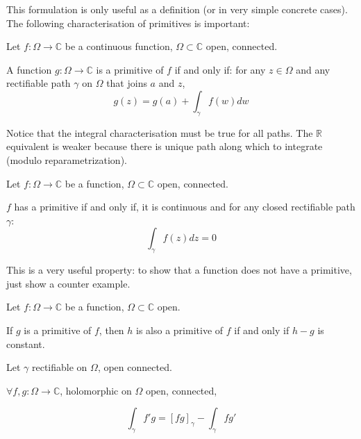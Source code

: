 This formulation is only useful as a definition (or in very simple concrete cases). The following characterisation of primitives is important:

\begin{thm*}
    Let $f: \Omega \rightarrow \mathbb{C}$ be a continuous function, $\Omega\subset\mathbb{C}$ open, connected.

    A function $g: \Omega \rightarrow \mathbb{C}$ is a primitive of $f$ if and only if: for any $z\in\Omega$ and any rectifiable path $\gamma$ on $\Omega$ that joins $a$ and $z$, 
    $$ g(z) = g(a) + \int_\gamma f(w)dw $$
\end{thm*}

\begin{note}
    Notice that the integral characterisation must be true for all paths. The $\mathbb{R}$ equivalent is weaker because there is unique path along which to integrate (modulo reparametrization).
\end{note}

\begin{thm*}
    Let $f: \Omega \rightarrow \mathbb{C}$ be a function, $\Omega\subset\mathbb{C}$ open, connected.

    $f$ has a primitive if and only if, it is continuous and for any closed rectifiable path $\gamma$: 
    $$ \int_\gamma f(z)dz = 0 $$
\end{thm*}

\begin{note}
    This is a very useful property: to show that a function does not have a primitive, just show a counter example.
\end{note}

\begin{thm*}
    Let $f: \Omega \rightarrow \mathbb{C}$ be a function, $\Omega\subset\mathbb{C}$ open.

    If $g$ is a primitive of $f$, then $h$ is also a primitive of $f$ if and only if $h - g$ is constant.
\end{thm*}

\begin{thm*}
    Let $\gamma$ rectifiable on $\Omega$, open connected.
    
    
     $\forall f, g: \Omega \rightarrow \mathbb{C}$, holomorphic on $\Omega$ open, connected,

     $$ \int_\gamma f'g = [fg]_\gamma - \int_\gamma fg'$$
\end{thm*}

